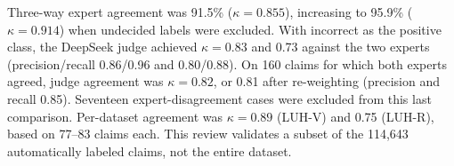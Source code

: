 \documentclass[conference,a4paper]{IEEEtran}
\begin{document}
Three-way expert agreement was 91.5\% ($\kappa=0.855$), increasing to 95.9\% ($\kappa=0.914$) when undecided labels were excluded. With incorrect as the positive class, the DeepSeek judge achieved $\kappa=0.83$ and 0.73 against the two experts (precision/recall 0.86/0.96 and 0.80/0.88). On 160 claims for which both experts agreed, judge agreement was $\kappa=0.82$, or 0.81 after re-weighting (precision and recall 0.85). Seventeen expert-disagreement cases were excluded from this last comparison. Per-dataset agreement was $\kappa=0.89$ (LUH-V) and 0.75 (LUH-R), based on 77--83 claims each. This review validates a subset of the 114,643 automatically labeled claims, not the entire dataset.

\begin{table}[ht]

\centering

\small

\caption{Agreement between the two medical experts and between the DeepSeek judge and the experts (95\% cluster-bootstrap intervals over answers; incorrect is the positive class; $n$ = claims compared).}

\label{tab:annval}


\end{table}
\end{document}
